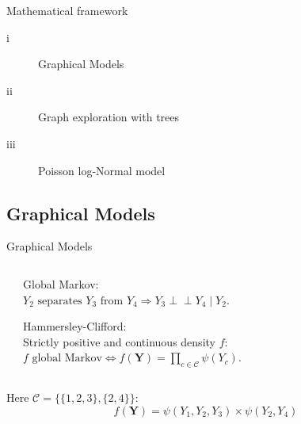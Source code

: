 \documentclass[11pt]{beamer}
\newcommand{\Ybf}{{\boldsymbol{Y}}}
\newcommand{\edgeunit}{1.5}
\newcommand{\bleu}[1]{\textcolor{Framableulight}{#1}}
\newcommand{\independent}{\perp \!\!\! \perp}
\begin{document}
\begin{frame}{}
\begin{center}
\Huge{\bleu{Mathematical framework}}
\end{center}
\normalsize
\begin{center}
\begin{description}
\item[i] Graphical Models
\item[ii]  Graph exploration with trees
\item[iii]  Poisson log-Normal model
\end{description}
\end{center}

\end{frame}


  \subsection{Graphical Models}
 \begin{frame}{Graphical Models}
 \begin{columns}
 \begin{column}{0.4\linewidth}
 \end{column}
  \begin{column}{0.6\linewidth}
\bleu{Global Markov:}\\
  $ Y_2 \text{ separates } Y_3 \text{ from } Y_4  \Rightarrow Y_3\independent Y_4 \mid Y_2.$
  \bigskip
   \bigskip
   
 \bleu{Hammersley-Clifford:}\\
Strictly positive and {continuous} density $f$:
$ f\text{ global Markov} \iff \displaystyle f(\Ybf) = \prod_{c\in \mathcal{C} }\psi(Y_c).$
 \end{column}
  \end{columns}
  \bigskip
  
Here $\mathcal{C} =\big\{\{1, 2, 3\},\{2, 4\}\big\}$:
$$f(\Ybf) = \psi(Y_1,Y_2,Y_3)\times \psi(Y_2,Y_4)$$

 \end{frame}
\end{document}
